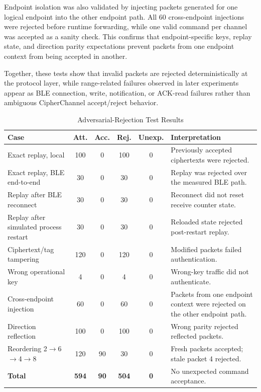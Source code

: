 \documentclass[journal]{IEEEtran}
\begin{document}
Endpoint isolation was also validated by injecting packets generated for one logical endpoint into the other endpoint path. All 60 cross-endpoint injections were rejected before runtime forwarding, while one valid command per channel was accepted as a sanity check. This confirms that endpoint-specific keys, replay state, and direction parity expectations prevent packets from one endpoint context from being accepted in another.

Together, these tests show that invalid packets are rejected deterministically at the protocol layer, while range-related failures observed in later experiments appear as BLE connection, write, notification, or ACK-read failures rather than ambiguous CipherChannel accept/reject behavior.

\begin{table}[!t]
\renewcommand{\arraystretch}{1.15}
\setlength{\tabcolsep}{3pt}
\caption{Adversarial-Rejection Test Results}
\label{tab:adversarial}
\centering
\scriptsize
\begin{tabular}{>{\raggedright\arraybackslash}p{2.4cm} c c c c >{\raggedright\arraybackslash}p{2.6cm}}
\toprule
\textbf{Case} & \textbf{Att.} & \textbf{Acc.} & \textbf{Rej.} & \textbf{Unexp.} & \textbf{Interpretation} \\
\midrule
Exact replay, local & 100 & 0 & 100 & 0 & Previously accepted ciphertexts were rejected. \\
Exact replay, BLE end-to-end & 30 & 0 & 30 & 0 & Replay was rejected over the measured BLE path. \\
Replay after BLE reconnect & 30 & 0 & 30 & 0 & Reconnect did not reset receive counter state. \\
Replay after simulated process restart & 30 & 0 & 30 & 0 & Reloaded state rejected post-restart replay. \\
Ciphertext/tag tampering & 120 & 0 & 120 & 0 & Modified packets failed authentication. \\
Wrong operational key & 4 & 0 & 4 & 0 & Wrong-key traffic did not authenticate. \\
Cross-endpoint injection & 60 & 0 & 60 & 0 & Packets from one endpoint context were rejected on the other endpoint path. \\
Direction reflection & 100 & 0 & 100 & 0 & Wrong parity rejected reflected packets. \\
Reordering 2$\rightarrow$6$\rightarrow$4$\rightarrow$8 & 120 & 90 & 30 & 0 & Fresh packets accepted; stale packet 4 rejected. \\
\midrule
\textbf{Total} & \textbf{594} & \textbf{90} & \textbf{504} & \textbf{0} & No unexpected command acceptance. \\
\bottomrule
\end{tabular}
\end{table}
\end{document}
